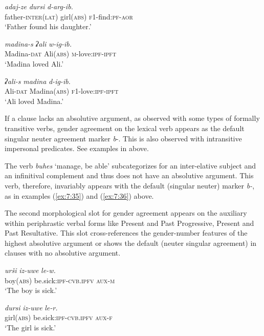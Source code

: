 ﻿\documentclass[output=paper]{langsci/langscibook}
\begin{document}
\ex %
\gll \emph{adaj-ze} \emph{dursi} \emph{d-arg-ib.}\\
father-\textsc{inter(lat)} girl(\textsc{abs}) \textsc{f1}-find:\textsc{pf}-\textsc{aor}\\
\glt `Father found his daughter.'
\z

\ex %
\ea %
\gll \emph{madina-s} \emph{ʡali} \emph{w-ig-ib.}\\
Madina-\textsc{dat} Ali(\textsc{abs}) \textsc{m}-love:\textsc{ipf}-\textsc{ipft}\\
\glt `Madina loved Ali.'

\ex %
\gll \emph{ʡali-s} \emph{madina} \emph{d-ig-ib.}\\
Ali-\textsc{dat} Madina(\textsc{abs}) \textsc{f1}-love:\textsc{ipf}-\textsc{ipft}\\
\glt `Ali loved Madina.'
\z
\z

If a clause lacks an absolutive argument, as observed with some types of
formally transitive verbs, gender agreement on the lexical verb appears
as the default singular neuter agreement marker \emph{b}-. This is also
observed with intransitive impersonal predicates. See examples in
 above.

The verb \emph{buhes} `manage, be able' subcategorizes for an
inter-elative subject and an infinitival complement and thus does not
have an absolutive argument. This verb, therefore, invariably appears
with the default (singular neuter) marker \emph{b-}, as in examples (\ref{ex:7:35})
and (\ref{ex:7:36}) above.

The second morphological slot for gender agreement appears on the auxiliary
within periphrastic verbal forms like Present and Past Progressive,
Present and Past Resultative. This slot cross-references the
gender-number features of the highest absolutive argument or shows the
default (neuter singular agreement) in clauses with no absolutive
argument.



\ea %
\ea %
\gll \emph{urši} \emph{iz-uwe} \emph{le-w.}\\
boy(\textsc{abs}) be.sick:\textsc{ipf}-\textsc{cvb.ipfv} \textsc{aux}-\textsc{m}\\
\glt `The boy is sick.'

\ex %
\gll \emph{dursi} \emph{iz-uwe} \emph{le-r.}\\
girl(\textsc{abs}) be.sick:\textsc{ipf}-\textsc{cvb.ipfv} \textsc{aux}-\textsc{f}\\
\glt `The girl is sick.'
\z
\end{document}
